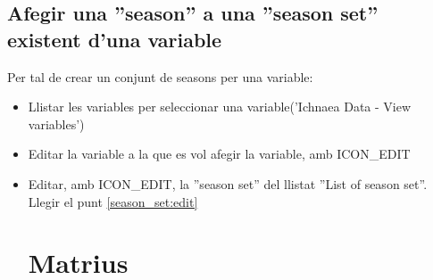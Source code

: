 \subsection{Afegir una ''season'' a una ''season set'' existent d'una variable}
Per tal de crear un conjunt de seasons per una variable:
\begin{itemize}
\item Llistar les variables per seleccionar una variable('Ichnaea Data - View variables')
\item Editar la variable a la que es vol afegir la variable, amb ICON_EDIT
\item Editar, amb ICON_EDIT, la ''season set'' del llistat ''List of season set''.
Llegir el punt \ref{season_set:edit}


\section{Matrius}

\end{itemize}
